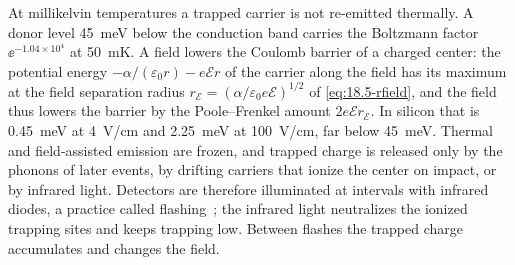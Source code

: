 At millikelvin temperatures a trapped carrier is not re-emitted thermally. A donor level \SI{45}{meV} below the conduction band carries the Boltzmann factor $\ee^{-1.04\times10^4}$ at \SI{50}{mK}. A field lowers the Coulomb barrier of a charged center: the potential energy $-\alpha/(\varepsilon_0r) - e\mathcal{E}r$ of the carrier along the field has its maximum at the field separation radius $r_{\mathcal{E}} = (\alpha/\varepsilon_0e\mathcal{E})^{1/2}$ of \cref{eq:18.5-rfield}, and the field thus lowers the barrier by the Poole--Frenkel amount $2e\mathcal{E}r_{\mathcal{E}}$. In silicon that is \SI{0.45}{meV} at \SI{4}{V/cm} and \SI{2.25}{meV} at \SI{100}{V/cm}, far below \SI{45}{meV}. Thermal and field-assisted emission are frozen, and trapped charge is released only by the phonons of later events, by drifting carriers that ionize the center on impact, or by infrared light. Detectors are therefore illuminated at intervals with infrared diodes, a practice called flashing~\cite[Sect.~2]{agnese2018nuclear}; the infrared light neutralizes the ionized trapping sites and keeps trapping low. Between flashes the trapped charge accumulates and changes the field.

